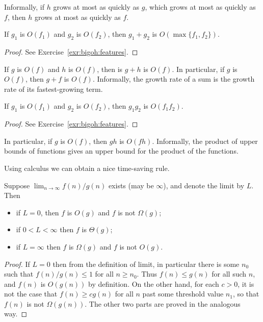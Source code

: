Informally, if $h$ grows at most as quickly as $g$, which grows 
at most as quickly as $f$, then $h$ grows at most as quickly as $f$. 

\begin{Lemma} \label{l:bigoh:3}
If $g_{1}$ is $O(f_{1})$ and 
$g_{2}$ is $O(f_{2})$, then 
$g_{1}+g_{2}$ is $O(\max \{ f_{1},f_{2} \} )$. 
\end{Lemma}
\begin{proof}
See Exercise~\ref{exr:bigoh:features}.
\end{proof}

If $g$ is $O(f)$ and $h$ is $O(f)$, then is $g+h$ is $O(f)$. In particular, 
if $g$ is $O(f)$, then $g+f$ is $O(f)$. Informally, the growth rate of a sum 
is the growth rate of its fastest-growing term.
 

\begin{Lemma}\label{l:bigoh:4}
 If $g_{1}$ is $O(f_{1})$ and 
$g_{2}$ is $O(f_{2})$, then 
$g_{1}  g_{2}$ is $O(f_{1}  f_{2})$. 
\end{Lemma}
\begin{proof}
See Exercise~\ref{exr:bigoh:features}.
\end{proof}

In particular, if $g$ is $O(f)$, then $g  h$ is $O(f  h)$. Informally,
the product of upper bounds of functions gives an upper bound for the
product of the functions.

Using calculus we can obtain a nice time-saving rule.

\begin{Lemma} \label{l:bigoh:lim}
Suppose $\lim_{n\to \infty} f(n)/g(n)$ exists (may be $\infty$), and denote 
the limit by $L$. Then
\begin{itemize}
\item if $L=0$, then $f$ is $O(g)$ and $f$ is not $\Omega(g)$;
\item if $0 < L < \infty$ then $f$ is $\Theta(g)$;
\item if $L = \infty$ then $f$ is $\Omega(g)$ and $f$ is not $O(g)$.
\end{itemize}
\end{Lemma}

\begin{proof}
If $L = 0$ then from the definition of limit, in particular there is some 
$n_0$ such that $f(n)/g(n) \leq 1$ for all $n \geq n_0$. Thus $f(n) \leq g(n)$ 
for all such $n$, and $f(n)$ is $O(g(n))$ by definition. On the other 
hand, for each $c > 0$, it is not the case that $f(n) \geq c g(n)$ for all
$n$ past some threshold value $n_1$, so that $f(n)$ is not $\Omega(g(n))$.
The other two parts are proved in the analogous way.
\end{proof}

